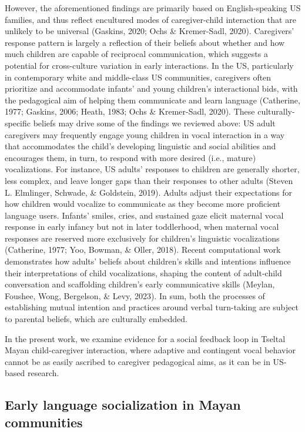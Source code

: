\documentclass[
  man]{apa6}
\begin{document}
However, the aforementioned findings are primarily based on English-speaking US families, and thus reflect encultured modes of caregiver-child interaction that are unlikely to be universal (Gaskins, 2020; Ochs \& Kremer-Sadl, 2020). Caregivers' response pattern is largely a reflection of their beliefs about whether and how much children are capable of reciprocal communication, which suggests a potential for cross-culture variation in early interactions. In the US, particularly in contemporary white and middle-class US communities, caregivers often prioritize and accommodate infants' and young children's interactional bids, with the pedagogical aim of helping them communicate and learn language (Catherine, 1977; Gaskins, 2006; Heath, 1983; Ochs \& Kremer-Sadl, 2020). These culturally-specific beliefs may drive some of the findings we reviewed above: US adult caregivers may frequently engage young children in vocal interaction in a way that accommodates the child's developing linguistic and social abilities and encourages them, in turn, to respond with more desired (i.e., mature) vocalizations. For instance, US adults' responses to children are generally shorter, less complex, and leave longer gaps than their responses to other adults (Steven L. Elmlinger, Schwade, \& Goldstein, 2019). Adults adjust their expectations for how children would vocalize to communicate as they become more proficient language users. Infants' smiles, cries, and sustained gaze elicit maternal vocal response in early infancy but not in later toddlerhood, when maternal vocal responses are reserved more exclusively for children's linguistic vocalizations (Catherine, 1977; Yoo, Bowman, \& Oller, 2018). Recent computational work demonstrates how adults' beliefs about children's skills and intentions influence their interpretations of child vocalizations, shaping the content of adult-child conversation and scaffolding children's early communicative skills (Meylan, Foushee, Wong, Bergelson, \& Levy, 2023). In sum, both the processes of establishing mutual intention and practices around verbal turn-taking are subject to parental beliefs, which are culturally embedded.

In the present work, we examine evidence for a social feedback loop in Tseltal Mayan child-caregiver interaction, where adaptive and contingent vocal behavior cannot be as easily ascribed to caregiver pedagogical aims, as it can be in US-based research.

\hypertarget{early-language-socialization-in-mayan-communities}{%
\subsection{Early language socialization in Mayan communities}\label{early-language-socialization-in-mayan-communities}}
\end{document}
